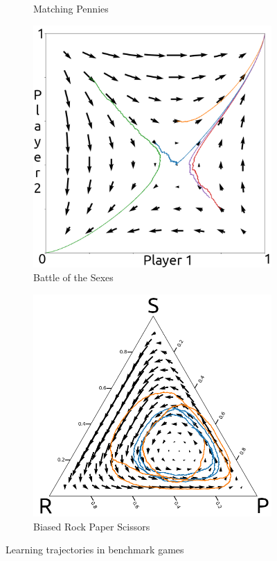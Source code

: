 \documentclass[10pt,a4paper]{article}
\begin{document}
\begin{figure}[h]
\begin{subfigure}[b]{0.33\textwidth}
        \caption{Matching Pennies}
    \end{subfigure}
    \begin{subfigure}[b]{0.33\textwidth}
        \includegraphics[width=\textwidth]{Figures/cl_bots.png}
        \caption{Battle of the Sexes}
    \end{subfigure}
    \begin{subfigure}[b]{0.33\textwidth}
        \includegraphics[width=\textwidth]{Figures/cl_rps.png}
        \caption{Biased Rock Paper Scissors} 
    \end{subfigure}
    \label{fig:learning}
    \caption{Learning trajectories in benchmark games}
\end{figure}
\end{document}
